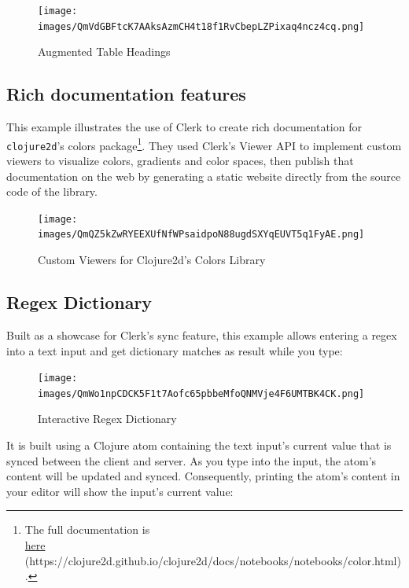 \documentclass[sigconf,screen]{acmart}
\newcommand{\passthrough}[1]{#1}
\begin{document}
\begin{figure}
\hypertarget{augmented-table-headings}{%
\centering
\texttt{[image: images/QmVdGBFtcK7AAksAzmCH4t18f1RvCbepLZPixaq4ncz4cq.png]}
\caption{Augmented Table Headings}\label{augmented-table-headings}
}
\end{figure}

\hypertarget{rich-documentation-features}{%
\subsection{Rich documentation features}\label{rich-documentation-features}}

This example illustrates the use of Clerk to create rich documentation for \passthrough{\lstinline!clojure2d!}'s colors package\footnote{The full documentation is\\
  {\href{https://clojure2d.github.io/clojure2d/docs/notebooks/notebooks/color.html}{here} (https://clojure2d.github.io/clojure2d/docs/notebooks/notebooks/color.html)}.}. They used Clerk's Viewer API to implement custom viewers to visualize colors, gradients and color spaces, then publish that documentation on the web by generating a static website directly from the source code of the library.

\begin{figure}
\hypertarget{custom-viewers-for-clojure2ds-colors-library}{%
\centering
\texttt{[image: images/QmQZ5kZwRYEEXUfNfWPsaidpoN88ugdSXYqEUVT5q1FyAE.png]}
\caption{Custom Viewers for Clojure2d's Colors Library}\label{custom-viewers-for-clojure2ds-colors-library}
}
\end{figure}

\hypertarget{regex-dictionary}{%
\subsection{Regex Dictionary}\label{regex-dictionary}}

Built as a showcase for Clerk's sync feature, this example allows entering a regex into a text input and get dictionary matches as result while you type:

\begin{figure}
\hypertarget{interactive-regex-dictionary}{%
\centering
\texttt{[image: images/QmWo1npCDCK5F1t7Aofc65pbbeMfoQNMVje4F6UMTBK4CK.png]}
\caption{Interactive Regex Dictionary}\label{interactive-regex-dictionary}
}
\end{figure}

It is built using a Clojure atom containing the text input's current value that is synced between the client and server. As you type into the input, the atom's content will be updated and synced. Consequently, printing the atom's content in your editor will show the input's current value:
\end{document}

